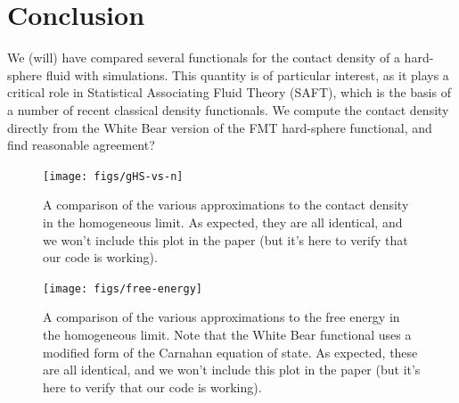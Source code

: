 \documentclass[letterpaper,twocolumn,amsmath,amssymb,prb]{revtex4-1}
\begin{document}
\section{Conclusion}
We (will) have compared several functionals for the contact density of
a hard-sphere fluid with simulations.  This quantity is of particular
interest, as it plays a critical role in Statistical Associating Fluid
Theory (SAFT), which is the basis of a number of recent classical
density functionals.  We compute the contact density directly from the
White Bear version of the FMT hard-sphere functional, and find
reasonable agreement?

\appendix

\begin{figure}
\texttt{[image: figs/gHS-vs-n]}
\caption{A comparison of the various approximations to the contact
  density in the homogeneous limit.  As expected, they are all
  identical, and we won't include this plot in the paper (but it's
  here to verify that our code is working).}
\label{fig:gHS-vs-n}
\end{figure}

\begin{figure}
\texttt{[image: figs/free-energy]}
\caption{A comparison of the various approximations to the free energy
  in the homogeneous limit.  Note that the White Bear functional uses
  a modified form of the Carnahan equation of state.  As expected,
  these are all identical, and we won't include this plot in the paper
  (but it's here to verify that our code is working).}
\label{fig:free-energy}
\end{figure}
\end{document}

